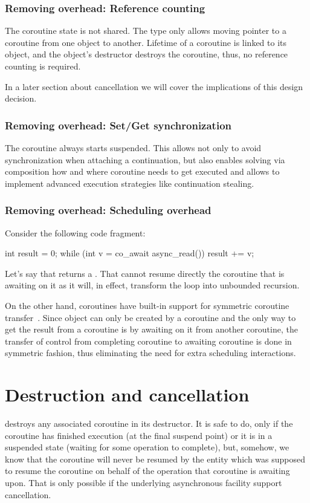 \subsubsection{Removing  overhead: Reference counting}

The coroutine state is not shared. The  type only allows moving pointer to a coroutine from one  object to another. Lifetime of a coroutine is linked to its  object, and the  object's destructor destroys the coroutine, thus, no reference counting is required.

In a later section about cancellation we will cover the implications of this design decision.

\subsubsection{Removing  overhead: Set/Get synchronization}

The  coroutine always starts suspended. This allows not only to avoid synchronization when attaching a continuation, but also enables solving via composition how and where coroutine needs to get executed and allows to implement advanced execution strategies like continuation stealing.

\subsubsection{Removing  overhead: Scheduling overhead}
Consider the following code fragment:
\begin{codeblock}
int result = 0;
while (int v = co_await async_read())
  result += v;
\end{codeblock}
Let's say that  returns a . That  cannot resume directly the coroutine that is awaiting on it as it will, in effect, transform the loop into unbounded recursion.

On the other hand, coroutines have built-in support for symmetric coroutine transfer~\cite{P0913R1}. Since  object can only be created by a coroutine and the only way to get the result from a coroutine is by awaiting on it from another coroutine, the transfer of control from completing coroutine to awaiting coroutine is done in symmetric fashion, thus eliminating the need for extra scheduling interactions.

\section{Destruction and cancellation}
 destroys any associated coroutine in its destructor. It is safe to do, only if the coroutine has finished execution (at the final suspend point) or it is in a suspended state (waiting for some operation to complete), but, somehow, we know that the coroutine will never be resumed by the entity which was supposed to resume the coroutine on behalf of the operation that coroutine is awaiting upon. That is only possible if the underlying asynchronous facility support cancellation.

